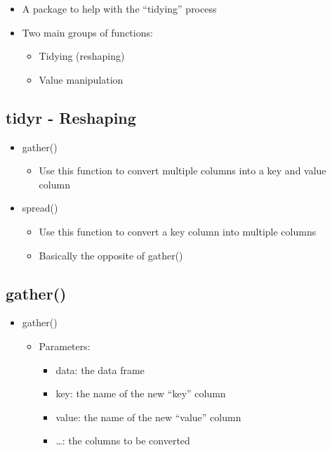 \documentclass[]{article}
\providecommand{\tightlist}{%
  \setlength{\itemsep}{0pt}\setlength{\parskip}{0pt}}
\begin{document}
\begin{itemize}
\tightlist
\item
  A package to help with the ``tidying'' process
\item
  Two main groups of functions:

  \begin{itemize}
  \tightlist
  \item
    Tidying (reshaping)
  \item
    Value manipulation
  \end{itemize}
\end{itemize}

\subsection{tidyr - Reshaping}\label{tidyr---reshaping}

\begin{itemize}
\tightlist
\item
  gather()

  \begin{itemize}
  \tightlist
  \item
    Use this function to convert multiple columns into a key and value
    column
  \end{itemize}
\item
  spread()

  \begin{itemize}
  \tightlist
  \item
    Use this function to convert a key column into multiple columns
  \item
    Basically the opposite of gather()
  \end{itemize}
\end{itemize}

\subsection{gather()}\label{gather}

\begin{itemize}
\tightlist
\item
  gather()

  \begin{itemize}
  \tightlist
  \item
    Parameters:

    \begin{itemize}
    \tightlist
    \item
      data: the data frame
    \item
      key: the name of the new ``key'' column
    \item
      value: the name of the new ``value'' column
    \item
      \ldots{}: the columns to be converted
    \end{itemize}
  \end{itemize}
\end{itemize}
\end{document}
